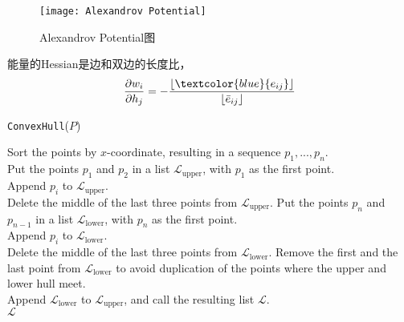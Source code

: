 \begin{figure}[h]
    \centering
    \texttt{[image: Alexandrov Potential]}
    \caption{Alexandrov Potential图}
    \label{fig:Alexandrov Potential}
\end{figure}

能量的Hessian是边和双边的长度比，
\begin{equation*}
    \frac{\partial w_i}{\partial h_j} = -\frac{\left \lfloor \textcolor{blue}{ e_{ij}} \right \rfloor }{\left \lfloor \bar{e}_{ij}  \right \rfloor } 
    \label{equ:Alexandrov}
\end{equation*}

\begin{algorithm}[H]
    \renewcommand{\thealgocf}{}
    \caption{\texttt{ConvexHull}($P$)}
    Sort the points by $x$-coordinate, resulting in a sequence $p_1,...,p_n$. \\
    Put the points $p_1$ and $p_2$ in a list $\mathcal{L}_{\mathrm{upper}}$, with $p_1$ as the first point. \\
    {            
        Append $p_i$ to $\mathcal{L}_{\mathrm{upper}}$. \\
        {
            Delete the middle of the last three points from $\mathcal{L}_{\mathrm{upper}}$.
        }
    }
    Put the points $p_n$ and $p_{n−1}$ in a list $\mathcal{L}_{\mathrm{lower}}$, with $p_n$ as the first point. \\
    {            
        Append $p_i$ to $\mathcal{L}_{\mathrm{lower}}$. \\
        {
            Delete the middle of the last three points from $\mathcal{L}_{\mathrm{lower}}$.
        }
    }
    Remove the first and the last point from $\mathcal{L}_{\mathrm{lower}}$ to avoid duplication of the points where the upper and lower hull meet. \\
    Append $\mathcal{L}_{\mathrm{lower}}$ to $\mathcal{L}_{\mathrm{upper}}$, and call the resulting list $\mathcal{L}$. \\
    \Return $\mathcal{L}$
\end{algorithm}
